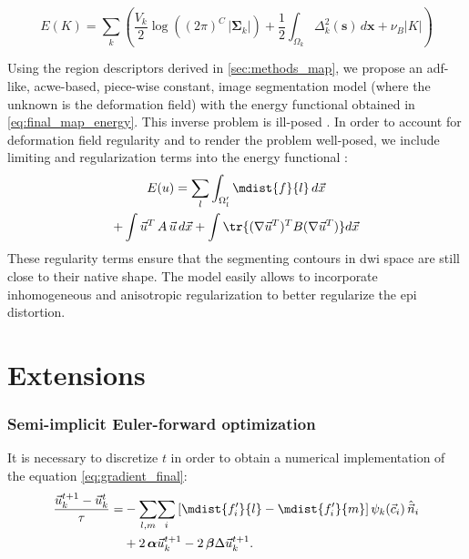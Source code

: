 \begin{equation}
E(K) = \sum\limits_k \left( \frac{ V_k }{2} \log{ \left( (2\pi)^{C}\,\left|\boldsymbol{\Sigma}_{k}\right| \right)}+ \frac{1}{2} \int_{\Omega_k} \Delta^2_k (\mathbf{s}) \,d\mathbf{x}+\nu_B \left|K\right| \right)
\end{equation}

{\color{red} {Using the region descriptors derived in \autoref{sec:methods_map}, we propose
an \gls{adf}-like, \gls{acwe}-based, piece-wise constant, image segmentation
model (where the unknown is the deformation field)
\cite{chan_active_2001} with the energy functional obtained in
\eqref{eq:final_map_energy}. This inverse problem is ill-posed
\cite{bertero_illposed_1988,hadamard_sur_1902}.
In order to account for deformation field regularity and to render the
problem well-posed, we include limiting and regularization terms into
the energy functional \cite{morozov_linear_1975,tichonov_solution_1963}:
%
\begin{multline}
E(u) = \sum\limits_l \int_{\Omega'_l} \mdist{f}{l} \,d\vec{x} \\
+ \int \vec{u}^T \, A \, \vec{u} \, d\vec{x} + \int \tr\{(\nabla \vec{u}^T)^T B (\nabla \vec{u}^T)\} d\vec{x}
\label{eq:complete_energy}
\end{multline}
%
These regularity terms ensure that the segmenting contours in
\gls{dwi} space are still close to their native shape. The model
easily allows to incorporate inhomogeneous and anisotropic
regularization \cite{nagel_investigation_1986} to better regularize
the \gls{epi} distortion.}}


\section{Extensions}

\subsubsection{Semi-implicit Euler-forward optimization}
It is necessary to discretize $t$ in order to obtain a numerical
implementation of the equation \eqref{eq:gradient_final}:
\begin{align}
\frac{\vec{u}_k^{t+1}-\vec{u}_k^t}{\tau} =
&- \underset{l,m}{\sum} \underset{i}{\sum}
\left[ \mdist{f_i'}{l} - \mdist{f_i'}{m}\right]
\psi_k(\vec{c}_i)\, \hat{\vec{n}}_i \notag\\
&+2\, \boldsymbol{\alpha} \vec{u}_k^{t+1}
-2\, \boldsymbol{\beta} \Delta \vec{u}_k^{t+1}.
\end{align}

